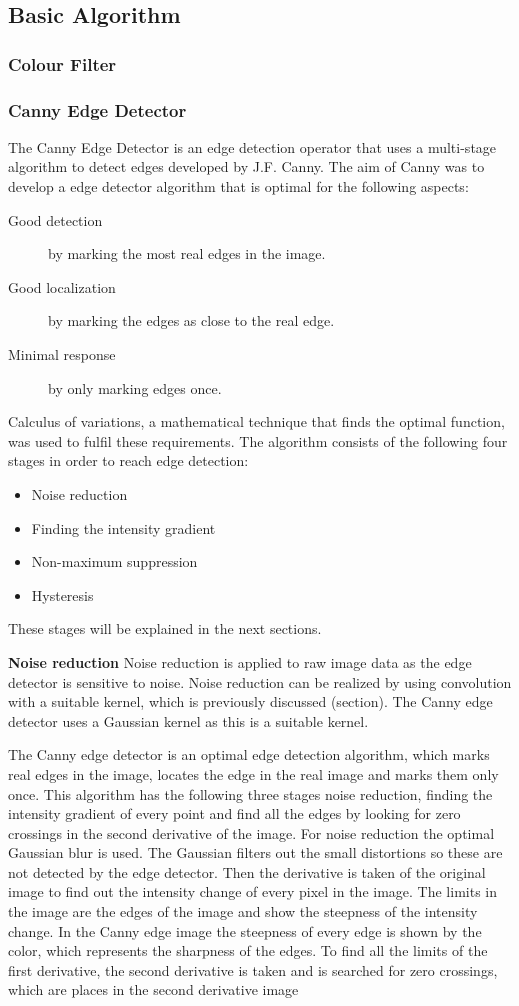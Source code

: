 \documentclass[a4paper]{article}
\begin{document}
\subsection{Basic Algorithm}
\subsubsection{Colour Filter}


\subsubsection{Canny Edge Detector}
The Canny Edge Detector is an edge detection operator that uses a multi-stage algorithm to detect edges developed by J.F. Canny. The aim of Canny was to develop a edge detector algorithm that is optimal for the following aspects:
\begin{description}
\item[Good detection] by marking the most real edges in the image.
\item[Good localization] by marking the edges as close to the real edge.
\item[Minimal response] by only marking edges once.
\end{description}
Calculus of variations, a mathematical technique that finds the optimal function, was used to fulfil these requirements. The algorithm consists of the following four stages in order to reach edge detection: 
\begin{itemize}
\item Noise reduction
\item Finding the intensity gradient
\item Non-maximum suppression
\item Hysteresis
\end{itemize}
These stages will be explained in the next sections.

\noindent\textbf{Noise reduction}
Noise reduction is applied to raw image data as the edge detector is sensitive to noise. Noise reduction can be realized by using convolution with a suitable kernel, which is previously discussed (section). The Canny edge detector uses a Gaussian kernel as this is a suitable kernel.

The Canny edge detector is an optimal edge detection algorithm, which marks real edges in the image, locates the edge in the real image and marks them only once. This algorithm has the following three stages noise reduction,  finding the intensity gradient of every point and find all the edges by looking for zero crossings in the second derivative of the image. For noise reduction the optimal Gaussian blur is used. The Gaussian filters out
the small distortions so these are not detected by the edge detector.
Then the derivative is taken of the original image to find out the intensity change of every pixel in the image. The limits in the image are the edges of the image and show the steepness of the intensity change. In the Canny edge image the steepness of every edge is shown by the color, which represents the sharpness of the edges. To find all the limits of the first derivative, the second derivative is taken and is searched for zero crossings, which are places in the second derivative image
\end{document}
